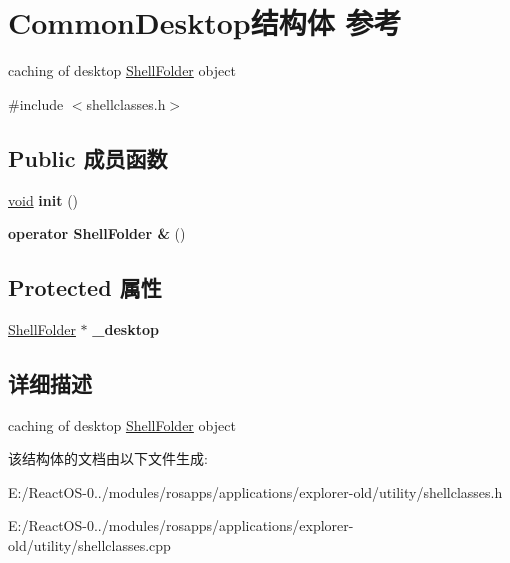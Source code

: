 \hypertarget{struct_common_desktop}{}\section{Common\+Desktop结构体 参考}
\label{struct_common_desktop}


caching of desktop \hyperlink{struct_shell_folder}{Shell\+Folder} object  




{\ttfamily \#include $<$shellclasses.\+h$>$}

\subsection*{Public 成员函数}
\begin{DoxyCompactItemize}
\item 
\mbox{\label{struct_common_desktop_a8b0c199ca0f8683f2cbc9ad0f7b6c0a3}} 
\hyperlink{interfacevoid}{void} {\bfseries init} ()
\item 
\mbox{\label{struct_common_desktop_a2bf8a0f1f965c37896d8b0ba93220b8b}} 
{\bfseries operator Shell\+Folder \&} ()
\end{DoxyCompactItemize}
\subsection*{Protected 属性}
\begin{DoxyCompactItemize}
\item 
\mbox{\label{struct_common_desktop_adc8e5b0bfe586741bcc2afe9ea24a5c9}} 
\hyperlink{struct_shell_folder}{Shell\+Folder} $\ast$ {\bfseries \+\_\+desktop}
\end{DoxyCompactItemize}


\subsection{详细描述}
caching of desktop \hyperlink{struct_shell_folder}{Shell\+Folder} object 

该结构体的文档由以下文件生成\+:\begin{DoxyCompactItemize}
\item 
E\+:/\+React\+O\+S-\/0../modules/rosapps/applications/explorer-\/old/utility/shellclasses.\+h\item 
E\+:/\+React\+O\+S-\/0../modules/rosapps/applications/explorer-\/old/utility/shellclasses.\+cpp\end{DoxyCompactItemize}

